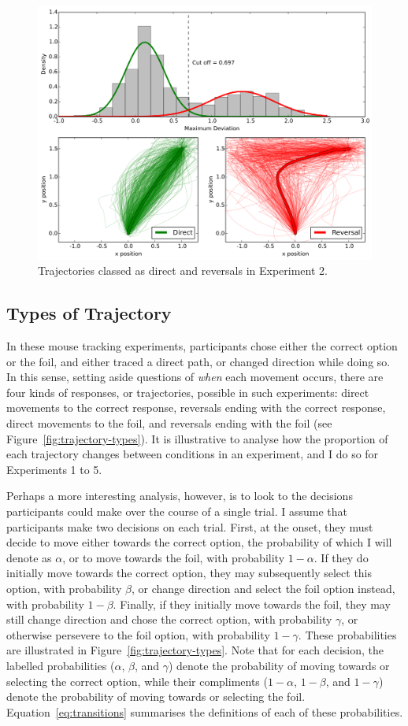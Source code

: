 \begin{figure}[ht]
  \centering
  \includegraphics[width=.8\textwidth]{../Appendices/imgs/reversals/exp2-reversals}
  \caption{
    \label{fig:exp2-reversals-in-chap}
    Trajectories classed as direct and reversals in Experiment 2.
  }
\end{figure}


\subsection{Types of Trajectory}

In these mouse tracking experiments, 
participants chose either the correct option or the foil,
and either traced a direct path, or changed direction while doing so.
In this sense, setting aside questions of \emph{when} each movement occurs,
there are four kinds of responses, or trajectories,
possible in such experiments:
direct movements to the correct response,
reversals ending with the correct response,
direct movements to the foil,
and reversals ending with the foil (see Figure~\ref{fig:trajectory-types}).
It is illustrative to analyse how the proportion of each trajectory
changes between conditions in an experiment,
and I do so for Experiments 1 to 5.

Perhaps a more interesting analysis, however,
is to look to the decisions participants could make
over the course of a single trial.
I assume that participants make two decisions on each trial.
First, at the onset, they must decide to move
either towards the correct option,
the probability of which I will denote as $\alpha$,
or to move towards the foil, with probability $1 - \alpha$.
If they do initially move towards the correct option,
they may subsequently select this option,
with probability $\beta$,
or change direction and select the foil option instead,
with probability $1 - \beta$.
Finally, if they initially move towards the foil,
they may still change direction and chose the correct option,
with probability $\gamma$,
or otherwise persevere to the foil option,
with probability $1 - \gamma$.
These probabilities are illustrated in Figure~\ref{fig:trajectory-types}.
Note that for each decision,
the labelled probabilities ($\alpha$, $\beta$, and $\gamma$)
denote the probability of moving towards or selecting the correct option,
while their compliments  ($1 - \alpha$, $1 - \beta$, and $1 - \gamma$)
denote the probability of moving towards or selecting the foil.
Equation~\ref{eq:transitions} summarises
the definitions of each of these probabilities.

